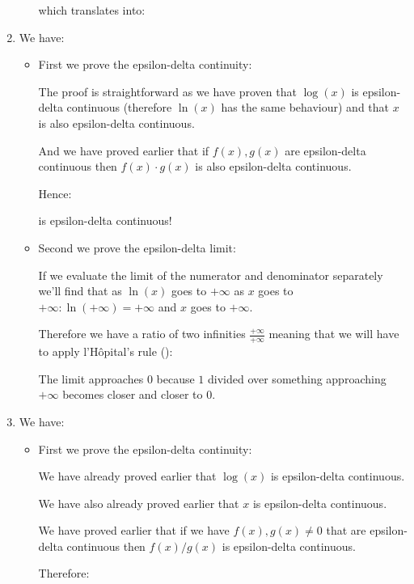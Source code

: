\begin{enumerate}
\begin{itemize}
			which translates into:
			
		\end{itemize}
		
		\item We have:
		
		
		\begin{itemize}
			\item First we prove the epsilon-delta continuity:
			
			The proof is straightforward as we have proven that $\log(x)$ is epsilon-delta continuous (therefore $\ln(x)$ has the same behaviour) and that $x$ is also epsilon-delta continuous.
			
			And we have proved earlier that if $f(x),g(x)$ are epsilon-delta continuous  then $f(x)\cdot g(x)$ is also epsilon-delta continuous.
			
			Hence:
			
			is epsilon-delta continuous!
			
			\item Second we prove the epsilon-delta limit:
			
			If we evaluate the limit of the numerator and denominator separately we'll find that as $\ln (x)$ goes to $+\infty$ as $x$ goes to $+\infty: \ln (+\infty)=+\infty$ and $x$ goes to $+\infty$.
			
			Therefore we have a ratio of two infinities $\frac{+\infty}{+\infty}$ meaning that we will have to apply l'Hôpital's rule ():
			
			The limit approaches $0$ because $1$ divided over something approaching $+\infty$ becomes closer and closer to $0$.
		\end{itemize}
		
		\item We have:
		
		
		\begin{itemize}
			\item First we prove the epsilon-delta continuity:
			
			We have already proved earlier that $\log(x)$ is epsilon-delta continuous.
			
			We have also already proved earlier that $x$ is epsilon-delta continuous.
			
			We have proved earlier that if we have $f(x),g(x)\neq 0$ that are epsilon-delta continuous then $f(x)/g(x)$ is epsilon-delta continuous.
		
			Therefore:
			

\end{itemize}
\end{enumerate}
